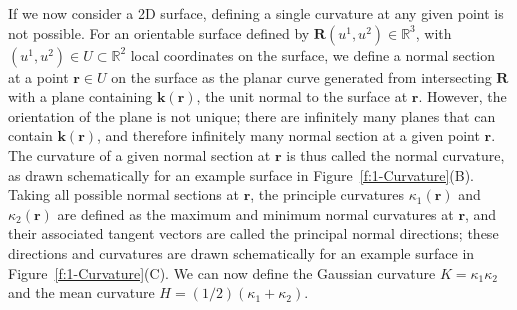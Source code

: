 If we now consider a 2D surface, defining a single curvature at any given point is not possible. For an orientable surface defined by $\mathbf{R}(u^1,u^2) \in \mathbb{R}^3$, with $(u^1,u^2) \in U \subset \mathbb{R}^2$ local coordinates on the surface, we define a normal section at a point $\mathbf{r} \in U$ on the surface as the planar curve generated from intersecting $\mathbf{R}$ with a plane containing $\mathbf{k}(\mathbf{r})$, the unit normal to the surface at $\mathbf{r}$.
However, the orientation of the plane is not unique; there are infinitely many planes that can contain $\mathbf{k}(\mathbf{r})$, and therefore infinitely many normal section at a given point $\mathbf{r}$.
The curvature of a given normal section at $\mathbf{r}$ is thus called the normal curvature, as drawn schematically for an example surface in Figure~\ref{f:1-Curvature}(B).
Taking all possible normal sections at $\mathbf{r}$, the principle curvatures $\kappa_1 (\mathbf{r})$ and $\kappa_2(\mathbf{r})$ are defined as the maximum and minimum normal curvatures at $\mathbf{r}$, and their associated tangent vectors are called the principal normal directions; these directions and curvatures are drawn schematically for an example surface in Figure~\ref{f:1-Curvature}(C).
We can now define the Gaussian curvature $K  = \kappa_1 \kappa_2$ and the mean curvature $H = (1/2) (\kappa_1+\kappa_2)$.

